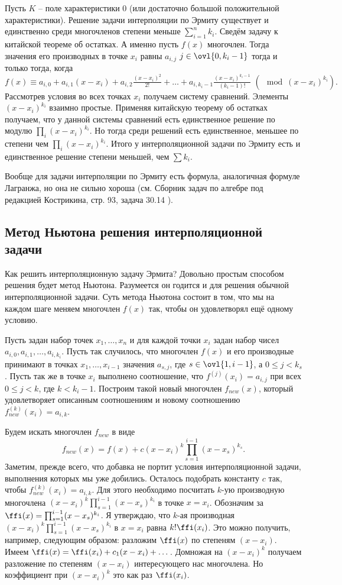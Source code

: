 \thrm Пусть $K$ -- поле характеристики 0 (или достаточно большой положительной характеристики). Решение задачи интерполяции по Эрмиту существует и единственно среди многочленов степени меньше $\sum_{i=1}^n k_i$.
\ethrm
\proof Сведём задачу к китайской теореме об остатках. А именно пусть $f(x)$ многочлен. Тогда значения его производных в точке $x_i$ равны $a_{i,j}$ $j\in \ovl{0,k_i-1}$ тогда и только тогда, когда
$$f(x)\equiv a_{i,0}+a_{i,1}(x-x_i)+a_{i,2}\tfrac{(x-x_i)^2}{2!}+\dots+ a_{i,k_i-1}\tfrac{(x-x_i)^{k_i-1}}{(k_i-1)!}\,\, (\mod (x-x_i)^{k_i}).$$
Рассмотрев условия во всех точках $x_i$ получаем систему сравнений. Элементы $(x-x_i)^{k_i}$ взаимно простые. Применяя китайскую теорему об остатках получаем, что у данной системы сравнений есть единственное решение по модулю $\prod_{i}(x-x_i)^{k_i}$. Но тогда среди решений есть единственное, меньшее по степени чем $\prod_{i}(x-x_i)^{k_i}$. Итого у интерполяционной задачи по Эрмиту есть и единственное решение степени меньшей, чем $\sum k_i$.
\endproof

\rm Вообще для  задачи интерполяции по Эрмиту  есть формула, аналогичная формуле Лагранжа, но она не сильно хороша (см. Сборник задач по алгебре под редакцией Кострикина, стр. 93, задача 30.14 ).\erm

\subsection{Метод Ньютона решения интерполяционной задачи}

Как решить интерполяционную задачу Эрмита? Довольно простым способом решения будет метод Ньютона. Разумеется он годится и для решения обычной интерполяционной задачи. Суть метода Ньютона состоит в том, что мы на каждом шаге меняем многочлен $f(x)$ так, чтобы он удовлетворял  ещё одному условию. 

Пусть задан набор точек $x_1,\dots, x_n$ и для каждой точки $x_i$ задан набор чисел $a_{i,0}, a_{i,1},\dots , a_{i,k_i}$. Пусть так случилось, что многочлен $f(x)$ и его производные принимают в точках $x_1,\dots,x_{i-1}$  значения $a_{s,j}$, где $s\in \ovl{1,i-1}$, а $0\leq j< k_s$. Пусть так же в точке $x_i$ выполнено соотношение, что $f^{(j)}(x_i)=a_{i,j}$ при всех $0\leq j<k$, где $k<k_i-1$. Построим такой новый многочлен $f_{new}(x)$, который удовлетворяет описанным соотношениям и новому соотношению $f^{(k)}_{new}(x_i)=a_{i,k}$.

Будем искать многочлен $f_{new}$ в виде $$f_{new}(x)= f(x)+c (x-x_i)^k\prod_{s=1}^{i-1} (x-x_s)^{k_s}.$$
Заметим, прежде всего, что добавка не портит условия интерполяционной задачи, выполнения которых мы уже добились. Осталось подобрать константу $c$ так, чтобы $f^{(k)}_{new}(x_i)=a_{i,k}$. Для этого необходимо посчитать $k$-ую производную многочлена $(x-x_i)^k\prod_{s=1}^{i-1} (x-x_s)^{k_i}$  в точке $x=x_i$. Обозначим за $\ffi(x)=\prod_{s=1}^{i-1} (x-x_s)^{k_i}$. Я утверждаю, что $k$-ая производная $(x-x_i)^k\prod_{s=1}^{i-1} (x-x_s)^{k_i}$ в $x=x_i$ равна $k!\ffi(x_i)$. Это можно получить, например, следующим образом: разложим $\ffi(x)$ по степеням $(x-x_i)$. Имеем $\ffi(x)=\ffi(x_i)+c_1(x-x_i)+\dots$. Домножая на $(x-x_i)^k$ получаем разложение по степеням $(x-x_i)$ интересующего нас многочлена. Но коэффициент при $(x-x_i)^k$ это как раз $\ffi(x_i)$. 

